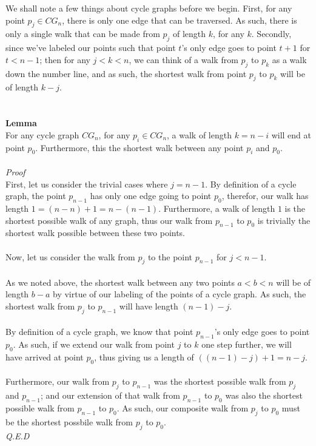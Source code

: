 \documentclass[a4paper,12pt]{article}
\begin{document}
We shall note a few things about cycle graphs before we begin. First, for any point $p_j \in CG_n$, there is only one edge that can be traversed. As such, there is only a single walk that can be made from $p_j$ of length $k$, for any $k$. Secondly, since we've labeled our points such that point $t$'s only edge goes to point $t + 1$ for $t < n - 1$; then for any $j < k < n$, we can think of a walk from $p_j$ to $p_k$ as a walk down the number line, and as such, the shortest walk from point $p_j$ to $p_k$ will be of length $k - j$.\\
\\
\\
\textbf{Lemma}\\
For any cycle graph $CG_n$, for any $p_i \in CG_n$, a walk of length $k = n - i$ will end at point $p_0$. Furthermore, this the shortest walk between any point $p_i$ and $p_0$.\\
\\
\textit{Proof}\\
First, let us consider the trivial cases where $j = n - 1$. By definition of a cycle graph, the point $p_{n-1}$ has only one edge going to point $p_0$, therefor, our walk has length $1 = (n - n) + 1 = n - (n - 1)$. Furthermore, a walk of length $1$ is the shortest possible walk of any graph, thus our walk from $p_{n-1}$ to $p_0$ is trivially the shortest walk possible between these two points.\\
\\ 
Now, let us consider the walk from $p_j$ to the point $p_{n-1}$ for $j < n - 1$.\\
\\
As we noted above, the shortest walk between any two points $a < b < n$ will be of length $b - a$ by virtue of our labeling of the points of a cycle graph. As such, the shortest walk from $p_j$ to $p_{n-1}$ will have length $(n - 1) - j$.\\
\\
By definition of a cycle graph, we know that point $p_{n-1}$'s only edge goes to point $p_0$. As such, if we extend our walk from point $j$ to $k$ one step further, we will have arrived at point $p_0$, thus giving us a length of $((n - 1) - j) + 1 = n - j$.\\
\\
Furthermore, our walk from $p_j$ to $p_{n-1}$ was the shortest possible walk from $p_j$ and $p_{n-1}$; and our extension of that walk from $p_{n-1}$ to $p_0$ was also the shortest possible walk from $p_{n-1}$ to $p_0$. As such, our composite walk from $p_j$ to $p_0$ must be the shortest possbile walk from $p_j$ to $p_0$.
\\
\textit{Q.E.D}\\ 
\\ 
\end{document}
